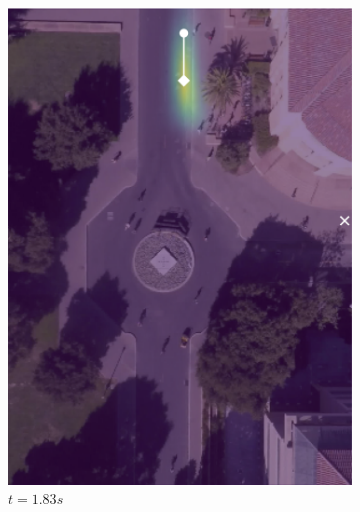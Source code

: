 \documentclass[letterpaper,10pt,conference]{ieeeconf}
\begin{document}
\begin{figure}
	\centering
	\begin{subfigure}[b]{.45\linewidth}
		\includegraphics[width=\linewidth]{./figures/FirstPage/gates_1_2_t=55.png}
		\caption{$t=1.83s$}
	\end{subfigure}
		\begin{subfigure}[b]{.45\linewidth}

\end{subfigure}
\end{figure}
\end{document}
